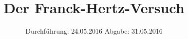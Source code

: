 

\subject{Versuchs Nummer 601}
\title{Der Franck-Hertz-Versuch}
\date{
  Durchführung: 24.05.2016
  \hspace{3em}
  Abgabe: 31.05.2016
}



\maketitle
\thispagestyle{empty}
\tableofcontents
\newpage






\printbibliography


